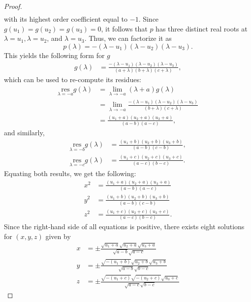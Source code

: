 \documentclass[10pt, a4paper]{article}
\theoremstyle{BoldTopSpacing}
\theoremstyle{BoldTopSpacing}
\theoremstyle{BoldTopSpacing}
\theoremstyle{BoldTopBottomSpacing}
\theoremstyle{BoldTopSpacing}
\theoremstyle{BoldTopBottomSpacing}
\theoremstyle{remark}
\begin{document}
\begin{proof}
\begin{align*}
\end{align*}
with its highest order coefficient equal to $-1$. Since $g(u_{1}) = g(u_{2}) = g(u_{3}) = 0$, it follows that $p$ has three distinct real roots at $\lambda = u_{1}, \lambda = u_{2}$, and $\lambda = u_{3}$. Thus, we can factorize it as
\[
    p(\lambda) = -(\lambda - u_{1})(\lambda - u_{2})(\lambda - u_{3}).
\]
This yields the following form for $g$
\begin{align*}
g(\lambda) &= \frac{-(\lambda - u_{1})(\lambda - u_{2})(\lambda - u_{3})}{(a+\lambda)(b+\lambda)(c+\lambda)},
\end{align*}
which can be used to re-compute its residues:
\begin{align*}
\underset{\lambda = -a}{\text{res}} g(\lambda) &= \lim_{\lambda \to -a} (\lambda + a)g(\lambda) \\
&= \lim_{\lambda \to -a} \frac{-(\lambda - u_{1})(\lambda - u_{2})(\lambda - u_{3})}{(b+\lambda)(c+\lambda)} \\
&= \frac{(u_{1} + a)(u_{2} + a)(u_{3} + a)}{(a-b)(a-c)},
\end{align*}
and similarly,
\begin{align*}
\underset{\lambda = -b}{\text{res}} g(\lambda) &= \frac{(u_{1} + b)(u_{2} + b)(u_{3} + b)}{(a-b)(c-b)}, \\
\underset{\lambda = -c}{\text{res}} g(\lambda) &= \frac{(u_{1} + c)(u_{2} + c)(u_{3} + c)}{(a-c)(b-c)}.
\end{align*}
Equating both results, we get the following:
\begin{equation}
\label{eq:squared-xyz-form}
\begin{aligned}
x^2 &= \frac{(u_{1} + a)(u_{2} + a)(u_{3} + a)}{(a-b)(a-c)} \\
y^2 &= \frac{(u_{1} + b)(u_{2} + b)(u_{3} + b)}{(a-b)(c-b)} \\
z^2 &= \frac{(u_{1} + c)(u_{2} + c)(u_{3} + c)}{(a-c)(b-c)}.
\end{aligned}
\end{equation}
Since the right-hand side of all equations is positive, there exists eight solutions for $(x, y, z)$ given by
\begin{equation}
\label{eq:sqrt-root-parameterization}
\begin{aligned}
x &= \pm \frac{\sqrt{u_{1} + a}\sqrt{u_{2} + a}\sqrt{u_{3} + a }}{\sqrt{a-b}\sqrt{a-c}} \\
y &= \pm \frac{\sqrt{-(u_{1} + b)}\sqrt{u_{2} + b}\sqrt{u_{3} + b}}{\sqrt{a-b}\sqrt{b-c}} \\
z &= \pm \frac{\sqrt{-(u_{1} + c)}\sqrt{-(u_{2} + c)}\sqrt{u_{3} + c}}{\sqrt{a-c}\sqrt{b-c}}

\end{aligned}
\end{equation}
\end{proof}
\end{document}
